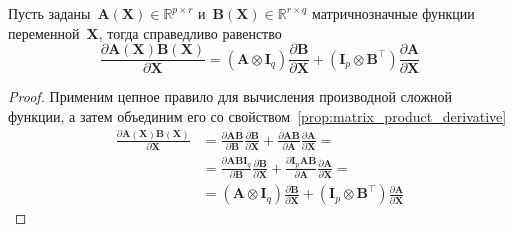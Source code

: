 \begin{lemma}\label{lemma:matrix_funcs_product_derivative}
    Пусть заданы~$\mathbf{A}(\mathbf{X}) \in \mathbb{R}^{p \times r}$ и~$\mathbf{B}(\mathbf{X}) \in \mathbb{R}^{r \times q}$ матричнозначные функции переменной~$\mathbf{X}$, тогда справедливо равенство
    \begin{equation}
        \frac{\partial\mathbf{A}(\mathbf{X})\mathbf{B}(\mathbf{X})}{\partial \mathbf{X}} = \left(\mathbf{A} \otimes \mathbf{I}_q
     \right) \frac{\partial\mathbf{B}}{\partial\mathbf{X}} + \left( \mathbf{I}_p \otimes \mathbf{B}^\top\right) \frac{\partial\mathbf{A}}{\partial\mathbf{X}}
    \end{equation}
\end{lemma}
\begin{proof}
Применим цепное правило для вычисления производной сложной функции, а затем объединим его со свойством~\ref{prop:matrix_product_derivative}
    \begin{align}
        \frac{\partial\mathbf{A}(\mathbf{X}) \mathbf{B}(\mathbf{X})}{\partial \mathbf{X}} &= \frac{\partial \mathbf{A}\mathbf{B}}{\partial\mathbf{B}}\frac{\partial\mathbf{B}}{\partial \mathbf{X}} + \frac{\partial \mathbf{A}\mathbf{B}}{\partial\mathbf{A}}\frac{\partial\mathbf{A}}{\partial \mathbf{X}} =\\
        &=\frac{\partial \mathbf{A}\mathbf{B}\mathbf{I}_q}{\partial\mathbf{B}}\frac{\partial\mathbf{B}}{\partial \mathbf{X}} + \frac{\partial \mathbf{I}_p\mathbf{A}\mathbf{B}}{\partial\mathbf{A}}\frac{\partial\mathbf{A}}{\partial \mathbf{X}} = \\
        &= \left( \mathbf{A} \otimes \mathbf{I}_q \right) \frac{\partial \mathbf{B}}{\partial \mathbf{X}} + \left( \mathbf{I}_p \otimes \mathbf{B}^\top \right) \frac{\partial \mathbf{A}}{\partial \mathbf{X}}
    \end{align}
\end{proof}

